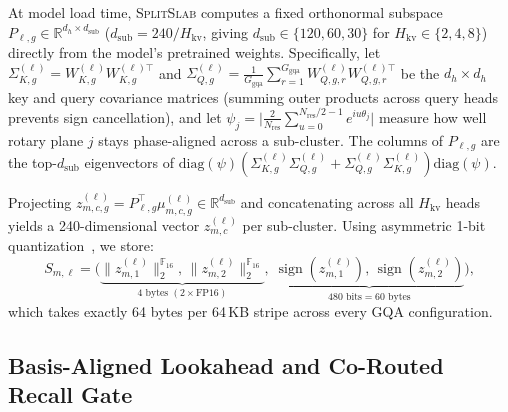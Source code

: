 \documentclass[pdflatex,sn-mathphys-num]{sn-jnl}
\theoremstyle{thmstyleone}
\newcommand{\SplitSlab}{\textsc{SplitSlab}}
\begin{document}
At model load time, \SplitSlab{} computes a fixed orthonormal subspace $P_{\ell,g} \in \mathbb{R}^{d_h \times d_{\mathrm{sub}}}$ ($d_{\mathrm{sub}} = 240 / H_{\mathrm{kv}}$, giving $d_{\mathrm{sub}} \in \{120, 60, 30\}$ for $H_{\mathrm{kv}} \in \{2, 4, 8\}$) directly from the model's pretrained weights. Specifically, let $\Sigma_{K,g}^{(\ell)} = W_{K,g}^{(\ell)} W_{K,g}^{(\ell)\top}$ and $\Sigma_{Q,g}^{(\ell)} = \frac{1}{G_{\mathrm{gqa}}} \sum_{r=1}^{G_{\mathrm{gqa}}} W_{Q,g,r}^{(\ell)} W_{Q,g,r}^{(\ell)\top}$ be the $d_h \times d_h$ key and query covariance matrices (summing outer products across query heads prevents sign cancellation), and let $\psi_j = \big|\frac{2}{N_{\mathrm{res}}} \sum_{u=0}^{N_{\mathrm{res}}/2 - 1} e^{i u \theta_j}\big|$ measure how well rotary plane $j$ stays phase-aligned across a sub-cluster. The columns of $P_{\ell,g}$ are the top-$d_{\mathrm{sub}}$ eigenvectors of $\mathrm{diag}(\psi)(\Sigma_{K,g}^{(\ell)} \Sigma_{Q,g}^{(\ell)} + \Sigma_{Q,g}^{(\ell)} \Sigma_{K,g}^{(\ell)})\mathrm{diag}(\psi)$.

Projecting $z_{m,c,g}^{(\ell)} = P_{\ell,g}^\top \mu_{m,c,g}^{(\ell)} \in \mathbb{R}^{d_{\mathrm{sub}}}$ and concatenating across all $H_{\mathrm{kv}}$ heads yields a 240-dimensional vector $z_{m,c}^{(\ell)}$ per sub-cluster. Using asymmetric 1-bit quantization~\cite{charikar2002simhash,gao2024rabitq}, we store:
\begin{equation}\label{eq:sketch_pack}
S_{m,\ell} = \Big(
\underbrace{\|z_{m,1}^{(\ell)}\|_2^{\mathbb{F}_{16}},\, \|z_{m,2}^{(\ell)}\|_2^{\mathbb{F}_{16}}}_{4\text{ bytes } (2 \times \mathrm{FP16})},\;
\underbrace{\operatorname{sign}(z_{m,1}^{(\ell)}),\, \operatorname{sign}(z_{m,2}^{(\ell)})}_{480\text{ bits} = 60\text{ bytes}}
\Big),
\end{equation}
which takes exactly 64 bytes per 64\,KB stripe across every GQA configuration.

\subsection{Basis-Aligned Lookahead and Co-Routed Recall Gate}\label{subsec:lookahead}
\end{document}
